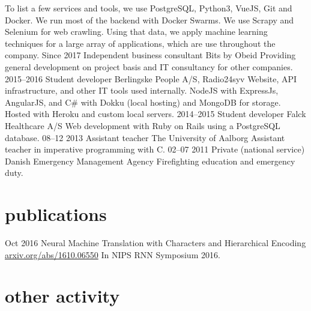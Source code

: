 \documentclass[]{friggeri-cv}
\begin{document}
\begin{entrylist}
{      To list a few services and tools, we use PostgreSQL, Python3, VueJS, Git and Docker. We run most of the backend with Docker Swarms. We use Scrapy and Selenium for web crawling. Using that data, we apply machine learning techniques for a large array of applications, which are use throughout the company.
	  }
  \entry
    {Since 2017}
    {Independent business consultant}
    {Bits by Obeid}
    {Providing general development on project basis and IT consultancy for other companies.}
  \entry
    {2015--2016}
    {Student developer}
    {Berlingske People A/S, Radio24syv}
    {
      Website, API infrastructure, and other IT tools used internally. 
      NodeJS with ExpressJs, AngularJS, and C\# with Dokku (local hosting) and MongoDB for storage.
      Hosted with Heroku and custom local servers.
    }
  \entry
    {2014--2015}
    {Student developer}
    {Falck Healthcare A/S}
    {
      Web development with Ruby on Rails using a PostgreSQL database.
    }
  \entry
    {08–12 2013}
    {Assistant teacher}
    {The University of Aalborg}
    {Assistant teacher in imperative programming with C.}
  \entry
    {02–07 2011}
    {Private (national service)}
    {Danish Emergency Management Agency}
    {Firefighting education and emergency duty.}
\end{entrylist}

\newpage

\section{publications}

\begin{entrylist}
  \entry
    {Oct 2016}
    {Neural Machine Translation with Characters and Hierarchical Encoding\\}
    {\href{https://arxiv.org/abs/1610.06550}{arxiv.org/abs/1610.06550}}
    {In NIPS RNN Symposium 2016.}
\end{entrylist}

\section{other activity}
\end{document}
